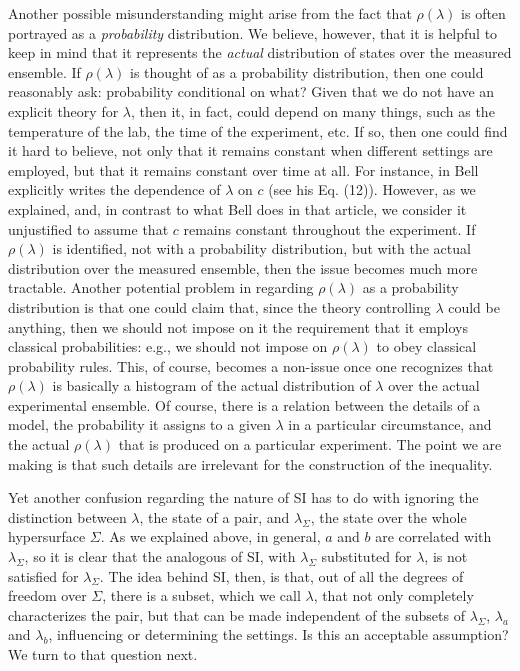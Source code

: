 \documentclass[letterpaper,12pt]{article}
\begin{document}
Another possible misunderstanding might arise from the fact that $\rho(\lambda)$ is often portrayed as a \emph{probability} distribution. We believe, however, that it is helpful to keep in mind that it represents the \emph{actual} distribution of states over the measured ensemble. If $\rho(\lambda)$ is thought of as a probability distribution, then one could reasonably ask: probability conditional on what? Given that we do not have an explicit theory for $\lambda$, then it, in fact, could depend on many things, such as the temperature of the lab, the time of the experiment, etc. If so, then one could find it hard to believe, not only that it remains constant when different settings are employed, but that it remains constant over time at all. For instance, in \cite{Bell1990} Bell explicitly writes the dependence of $\lambda$ on $c$ (see his Eq. (12)). However, as we explained, and, in contrast to what Bell does in that article, we consider it unjustified to assume that $c$ remains constant throughout the experiment. If $\rho(\lambda)$ is identified, not with a probability distribution, but with the actual distribution over the measured ensemble, then the issue becomes much more tractable. Another potential problem in regarding $\rho(\lambda)$ as a probability distribution is that one could claim that, since the theory controlling $\lambda$ could be anything, then we should not impose on it the requirement that it employs classical probabilities: e.g., we should not impose on $\rho(\lambda)$ to obey classical probability rules. This, of course, becomes a non-issue once one recognizes that $\rho(\lambda)$ is basically a histogram of the actual distribution of $\lambda$ over the actual experimental ensemble. Of course, there is a relation between the details of a model, the probability it assigns to a given $\lambda$ in a particular circumstance, and the actual $\rho(\lambda)$ that is produced on a particular experiment. The point we are making is that such details are irrelevant for the construction of the inequality.

Yet another confusion regarding the nature of SI has to do with ignoring the distinction between $\lambda$, the state of a pair, and $\lambda_\Sigma$, the state over the whole hypersurface $\Sigma$. As we explained above, in general, $a$ and $b$ are correlated with $\lambda_\Sigma$, so it is clear that the analogous of SI, with $\lambda_\Sigma$ substituted for $\lambda$, is not satisfied for $\lambda_\Sigma$. The idea behind SI, then, is that, out of all the degrees of freedom over $\Sigma$, there is a subset, which we call $\lambda$, that not only completely characterizes the pair, but that can be made independent of the subsets of $\lambda_\Sigma$, $\lambda_a$ and $\lambda_b$, influencing or determining the settings. Is this an acceptable assumption? We turn to that question next.
\end{document}
